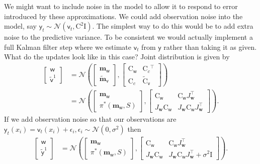 \documentclass{article}
\newcommand{\vv}[1]{\boldsymbol{#1}}
\newcommand{\mm}[1]{\mathrm{#1}}
\newcommand{\rv}[1]{\mathsf{#1}}
\newcommand{\vrv}[1]{\vv{\rv{#1}}}
\newcommand{\dist}[1]{\mathcal{#1}}
\newcommand{\set}[1]{#1}
\newcommand{\latwt}{\vrv{w}}
\newcommand{\latwtst}{\vv{w}}
\begin{document}
We might want to include noise in the model to allow it to respond to error introduced by these approximations.
We could add observation noise into the model, say \(\rv{y}_t\sim\dist{N}(\rv{v}_t, \mm{C}^2\mm{I}).\)
The simplest way to do this would be to add extra noise to the predictive variance.
To be consistent we would actually implement a full Kalman filter step where we estimate \(\rv{v}_t\) from \(\rv{y}\) rather than taking it as given.
What do the updates look like in this case?
Joint distribution is given by
\begin{align*}
\left[\begin{array}{c}
    \latwt\\ \tilde{\vrv{v}}^1
\end{array}\right]
&=\dist{N}\left(
    \left[\begin{array}{c}
        \vv{m}_{\latwt}\\
        \tilde{\vv{m}}_{\vrv{v}}
    \end{array}\right],
    \left[\begin{array}{cc}
        \mm{C}_{\latwt} & \mm{C}_{c}{}^\top\\
        \mm{C}_{c}& \tilde{\mm{C}}_{\vrv{v}}
    \end{array}\right]
\right)\\
&=\dist{N}\left(
    \left[\begin{array}{c}
        \vv{m}_{\latwt}\\
        \pi^*(\vv{m}_{\latwt},\set{S})
    \end{array}\right],
    \left[\begin{array}{cc}
        \mm{C}_{\latwt} &
          \mm{C}_{\latwt} J_{\latwtst}^\top\\
        J_{\latwtst}\mm{C}_{\latwt}&
          J_{\latwtst}\mm{C}_{\latwt}J_{\latwtst}^{\top}
    \end{array}\right]
\right).
\end{align*}
If we add observation noise so that our observations are \(\rv{y}_{t}(x_i)=\rv{v}_{t}(x_i)+\epsilon_i,\epsilon_i\sim\dist{N}(0,\sigma^2)\) then
\begin{align*}
\left[\begin{array}{c}
    \latwt\\ \tilde{\vrv{y}}^1
\end{array}\right]
&=\dist{N}\left(
    \left[\begin{array}{c}
        \vv{m}_{\latwt}\\
        \pi^*(\vv{m}_{\latwt},\set{S})
    \end{array}\right],
    \left[\begin{array}{cc}
        \mm{C}_{\latwt} &
          \mm{C}_{\latwt}J_{\latwtst}^\top\\
        J_{\latwtst}\mm{C}_{\latwt}&
          J_{\latwtst}\mm{C}_{\latwt}J_{\latwtst}^{\top} + \sigma^2\mm{I}
    \end{array}\right]
\right).
\end{align*}
\end{document}
